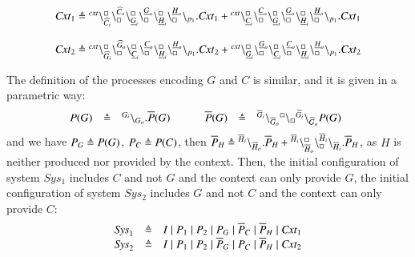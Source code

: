 \[
\begin{array}{l@{\hspace{0.1cm}}c@{\hspace{0.1cm}}l}
\mathit{Cxt}_1 & \defeq &\startchain{\mathit{cxt}}\chainedlink{\widehat{C}_i}{\noact}\chainedlink{\noact}{\widehat{C}_o}\chainedlink{\underline{G}_i}{\noact}\chainedlink{\noact}{\underline{G}_o}
\chainedlink{\underline{H}_i}{\noact}\chainedlink{\noact}{\underline{H}_o}\chainend{p_1}.\mathit{Cxt}_1 			                      +
                              \startchain{\mathit{cxt}}\chainedlink{\underline{C}_i}{\noact}\chainedlink{\noact}{\underline{C}_o}\chainedlink{\underline{G}_i}{\noact}\chainedlink{\noact}{\underline{G}_o}\chainedlink{\underline{H}_i}{\noact}\chainedlink{\noact}{\underline{H}_o}\chainend{p_1}.\mathit{Cxt}_1 \\
                              \\
                              \mathit{Cxt}_2 & \defeq &\startchain{\mathit{cxt}}\chainedlink{\widehat{G}_i}{\noact}\chainedlink{\noact}{\widehat{G}_o}\chainedlink{\underline{C}_i}{\noact}\chainedlink{\noact}{\underline{C}_o}\chainedlink{\underline{H}_i}{\noact}\chainedlink{\noact}{\underline{H}_o}\chainend{p_1}.\mathit{Cxt}_2 	                      +
                              \startchain{\mathit{cxt}}\chainedlink{\underline{G}_i}{\noact}\chainedlink{\noact}{\underline{G}_o}\chainedlink{\underline{C}_i}{\noact}\chainedlink{\noact}{\underline{C}_o}\chainedlink{\underline{H}_i}{\noact}\chainedlink{\noact}{\underline{H}_o}\chainend{p_1}.\mathit{Cxt}_2
\end{array}
\]

The definition of the processes encoding $G$ and $C$ is similar, and it is given in a parametric way:
\[
\begin{array}{lcl @{\hspace{1cm}}lcl}
P(G) &\defeq&\link{G_i}{G_o}.\overline{P}(G)\   & \overline{P}(G)&\defeq&\link{\overline{G}_i}{\overline{G}_o} \link{\noact}{\noact}\link{\widetilde{G}_i}{\widetilde{G}_o}P(G) \ \ 			                      
\end{array}
\]
and we have $P_G \triangleq P(G)$, $P_C \triangleq P(C)$,  then $\overline{P}_H \triangleq {}^{\overline{H}_i} \backslash_{\overline{H}_o}.\overline{P}_H + {}^{\overline{H}_i}\backslash_{\overline{H}_o}^{\scriptstyle {\square}}\backslash_{\scriptstyle {\square}}^{\overline{H}_i}\backslash_{\overline{H}_i}.\overline{P}_H$, as $H$ is neither produced nor provided by the context.
Then, the initial configuration of system $Sys_1$ includes $C$ and not $G$ and the context can only provide $G$,
the initial configuration of system $Sys_2$ includes $G$ and not $C$ and the context can only provide $C$:
\[
\begin{array}{lcl}
\mathit{Sys}_1 & \triangleq & I\mid  P_1 \mid P_2 \mid P_G \mid \overline{P}_C \mid \overline{P}_H\mid \mathit{Cxt}_1 \\
\mathit{Sys}_2 & \triangleq & I \mid P_1 \mid P_2 \mid \overline{P}_G \mid P_C \mid \overline{P}_H\mid \mathit{Cxt}_2\\
\end{array}
\]

